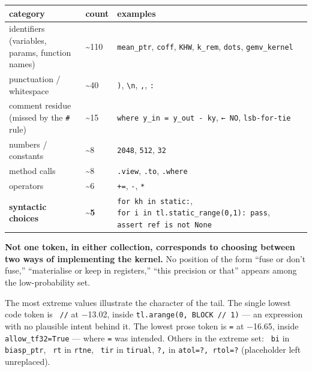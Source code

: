 \documentclass[
  11pt,
]{article}
\begin{document}
\begin{longtable}[]{@{}
  >{\raggedright\arraybackslash}p{}
  >{\raggedright\arraybackslash}p{}
  >{\raggedright\arraybackslash}p{}@{}}
\toprule
category & count & examples \\
\midrule
\endhead
identifiers (variables, params, function names) & \textasciitilde110 &
\texttt{mean\_ptr}, \texttt{coff}, \texttt{KHW}, \texttt{k\_rem},
\texttt{dots}, \texttt{gemv\_kernel} \\
punctuation / whitespace & \textasciitilde40 & \texttt{)},
\texttt{\textbackslash{}n}, \texttt{,}, \texttt{:} \\
comment residue (missed by the \texttt{\#} rule) & \textasciitilde15 &
\texttt{where\ y\_in\ =\ y\_out\ -\ ky}, \texttt{←\ NO},
\texttt{lsb-for-tie} \\
numbers / constants & \textasciitilde8 & \texttt{2048}, \texttt{512},
\texttt{32} \\
method calls & \textasciitilde8 & \texttt{.view}, \texttt{.to},
\texttt{.where} \\
operators & \textasciitilde6 & \texttt{+=}, \texttt{-}, \texttt{*} \\
\textbf{syntactic choices} & \textbf{\textasciitilde5} &
\texttt{for\ kh\ in\ static:},
\texttt{for\ i\ in\ tl.static\_range(0,1):\ pass},
\texttt{assert\ ref\ is\ not\ None} \\
\bottomrule
\end{longtable}

\textbf{Not one token, in either collection, corresponds to choosing
between two ways of implementing the kernel.} No position of the form
``fuse or don't fuse,'' ``materialise or keep in registers,'' ``this
precision or that'' appears among the low-probability set.

The most extreme values illustrate the character of the tail. The single
lowest code token is \texttt{\textquotesingle{}\ //\textquotesingle{}}
at −13.02, inside \texttt{tl.arange(0,\ BLOCK\ //\ 1)} --- an expression
with no plausible intent behind it. The lowest prose token is
\texttt{\textquotesingle{}\textbar{}=\textquotesingle{}} at −16.65,
inside
\texttt{\textasciigrave{}allow\_tf32\textbar{}=\textbar{}True\textasciigrave{}}
--- where \texttt{=} was intended. Others in the extreme set:
\texttt{\textquotesingle{}\ bi\textquotesingle{}} in
\texttt{biasp\_ptr}, \texttt{\textquotesingle{}\ rt\textquotesingle{}}
in \texttt{rtne}, \texttt{\textquotesingle{}\ tir\textquotesingle{}} in
\texttt{tirual}, \texttt{\textquotesingle{}?,\textquotesingle{}} in
\texttt{atol=?,\ rtol=?} (placeholder left unreplaced).
\end{document}
